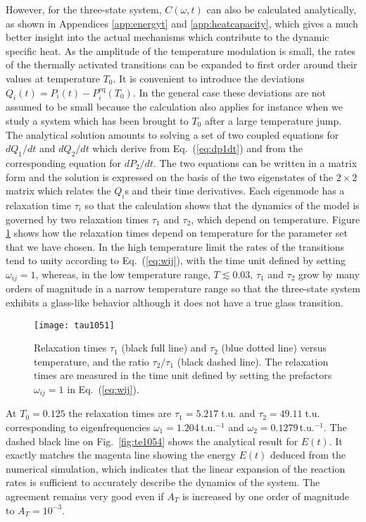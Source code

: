 \documentclass[pre,a4paper,twocolumn,superscriptaddress,%
floatfix]{revtex4}
\newcommand{\dtac}{\ensuremath{A_T}}
\begin{document}
However, for the three-state
system, $C(\omega,t)$ can also be calculated analytically, as shown in
Appendices \ref{app:energyt} and \ref{app:heatcapacity}, which gives a much
better insight into the actual mechanisms which contribute to the dynamic
specific heat.
As the amplitude of the temperature modulation is small, the rates of the
thermally activated transitions can be expanded to first order around their
values at temperature $T_0$. It is convenient to introduce the deviations
$Q_i(t) = P_i(t) - P_i^{\mathrm{eq}}(T_0)$. In the general case these
deviations are not assumed to be small because the calculation also applies
for instance when we study a system which has been brought to $T_0$ after a
large temperature jump. The analytical solution amounts to solving a set
of two coupled equations for $dQ_1/dt$ and $dQ_2/dt$ which derive
from Eq.~(\ref{eq:dp1dt}) and from the corresponding
equation for $dP_2/dt$. The two equations can be written in a matrix form and
the solution is expressed on the basis of the two eigenstates of the
$2 \times 2$ matrix which relates the $Q_i$s and their time derivatives. Each
eigenmode has a relaxation time $\tau_i$ so that the calculation shows that the
dynamics of the model is governed by two relaxation times $\tau_1$ and
$\tau_2$, which depend on temperature.
Figure \ref{fig:tau} shows how the relaxation times depend on temperature for
the parameter set that we have chosen.
In the high temperature limit
  the rates of the transitions tend to unity according
  to Eq.~(\ref{eq:wij}), with the time unit defined by
setting  $\omega_{ij} =  1$, whereas, in the low
temperature range, 
$T \lesssim 0.03$, $\tau_1$ and $\tau_2$ grow by many orders of magnitude in a
narrow temperature range so that the three-state system exhibits a glass-like
behavior although it does not have a true glass transition.


\begin{figure}[h]
  \centering
  \texttt{[image: tau1051]}
  \caption{Relaxation times $\tau_1$ (black full line) and $\tau_2$
    (blue dotted line) versus temperature,
    and the ratio $\tau_2/\tau_1$ (black dashed line).
    The relaxation times are
    measured in the time unit defined by setting the prefactors $\omega_{ij} =
  1$ in Eq.~(\ref{eq:wij}).}
  \label{fig:tau}
\end{figure}

At $T_0 = 0.125$ the relaxation times are
$\tau_1 = 5.217\;$t.u. and $\tau_2 = 49.11\;$t.u. corresponding to
eigenfrequencies $\omega_1 = 1.204\,$t.u.$^{-1}$ and $\omega_2 =
0.1279\,$t.u.$^{-1}$.
The dashed black line on Fig.~\ref{fig:te1054} shows the analytical result for
$E(t)$.
It exactly matches the magenta line showing the energy $E(t)$ deduced from
the numerical simulation, which indicates that the linear expansion of the
reaction rates is sufficient to accurately describe the dynamics of the
system. The agreement remains very good even if $\dtac$ is increased by one
order of magnitude to $\dtac = 10^{-3}$.
\end{document}
